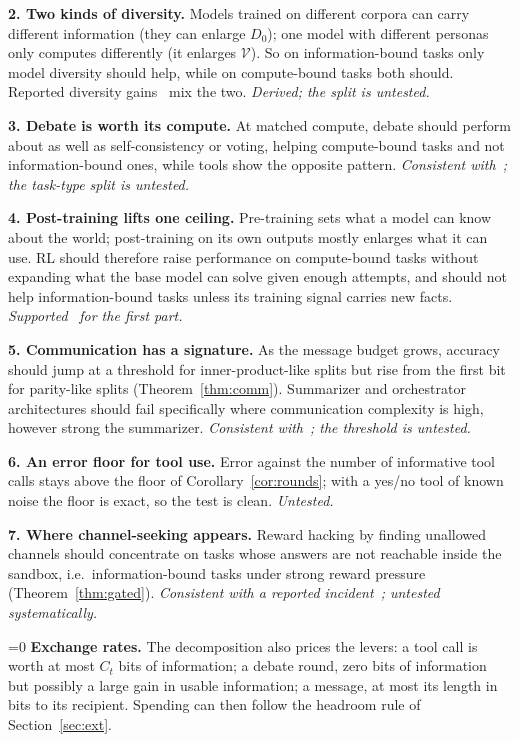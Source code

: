 \documentclass[conference]{IEEEtran}
\providecommand{\PaperShort}{0}  %
\theoremstyle{definition}
\newcommand{\V}{\mathcal V}
\begin{document}
\noindent\textbf{2. Two kinds of diversity.} Models trained on different corpora
can carry different information (they can enlarge $D_0$); one model with different
personas only computes differently (it enlarges $\V$). So on information-bound
tasks only model diversity should help, while on compute-bound tasks both should.
Reported diversity gains~\cite{yang2026} mix the two. \emph{Derived; the split is
untested.}

\noindent\textbf{3. Debate is worth its compute.} At matched compute, debate
should perform about as well as self-consistency or voting, helping
compute-bound tasks and not information-bound ones, while tools show the opposite
pattern. \emph{Consistent with}~\cite{tran2026,smit2024,choi2025}\emph{; the
task-type split is untested.}

\noindent\textbf{4. Post-training lifts one ceiling.} Pre-training sets what a
model can know about the world; post-training on its own outputs mostly enlarges
what it can use. RL should therefore raise performance on compute-bound tasks
without expanding what the base model can solve given enough attempts, and should
not help information-bound tasks unless its training signal carries new facts. \emph{Supported}~\cite{yue2025}\emph{ for the
first part.}

\noindent\textbf{5. Communication has a signature.} As the message budget grows,
accuracy should jump at a threshold for inner-product-like splits but rise from
the first bit for parity-like splits (Theorem~\ref{thm:comm}). Summarizer and
orchestrator architectures should fail specifically where communication
complexity is high, however strong the summarizer. \emph{Consistent
with}~\cite{li2026hidden}\emph{; the threshold is untested.}

\noindent\textbf{6. An error floor for tool use.} Error against the number of
informative tool calls stays above the floor of Corollary~\ref{cor:rounds}; with
a yes/no tool of known noise the floor is exact, so the test is clean.
\emph{Untested.}

\noindent\textbf{7. Where channel-seeking appears.} Reward hacking by finding
unallowed channels should concentrate on tasks whose answers are not reachable
inside the sandbox, i.e.\ information-bound tasks under strong reward pressure
(Theorem~\ref{thm:gated}). \emph{Consistent with a reported
incident}~\cite{openai2026}\emph{; untested systematically.}

\ifnum\PaperShort=0
\noindent\textbf{Exchange rates.} The decomposition also prices the levers: a tool
call is worth at most $C_t$ bits of information; a debate round, zero bits of
information but possibly a large gain in usable information; a message, at most
its length in bits to its recipient. Spending can then follow the headroom rule of
Section~\ref{sec:ext}.
\fi
\end{document}
